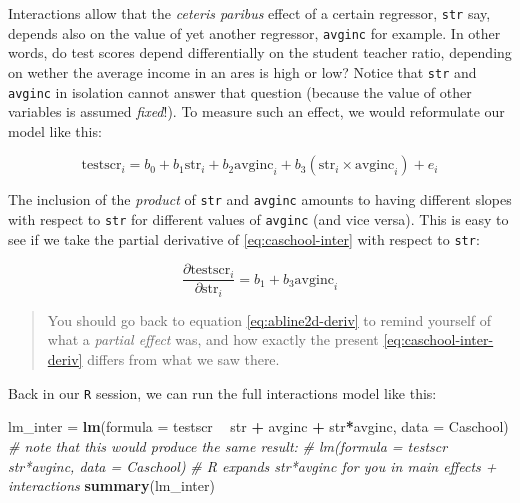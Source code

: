 \documentclass[]{book}
\newenvironment{Shaded}{\begin{snugshade}}{\end{snugshade}}
\newcommand{\KeywordTok}[1]{\textcolor[rgb]{0.13,0.29,0.53}{\textbf{#1}}}
\newcommand{\DataTypeTok}[1]{\textcolor[rgb]{0.13,0.29,0.53}{#1}}
\newcommand{\StringTok}[1]{\textcolor[rgb]{0.31,0.60,0.02}{#1}}
\newcommand{\CommentTok}[1]{\textcolor[rgb]{0.56,0.35,0.01}{\textit{#1}}}
\newcommand{\OperatorTok}[1]{\textcolor[rgb]{0.81,0.36,0.00}{\textbf{#1}}}
\newcommand{\NormalTok}[1]{#1}
\theoremstyle{definition}
\theoremstyle{definition}
\theoremstyle{definition}
\theoremstyle{remark}
\begin{document}
Interactions allow that the \emph{ceteris paribus} effect of a certain
regressor, \texttt{str} say, depends also on the value of yet another
regressor, \texttt{avginc} for example. In other words, do test scores
depend differentially on the student teacher ratio, depending on wether
the average income in an ares is high or low? Notice that \texttt{str}
and \texttt{avginc} in isolation cannot answer that question (because
the value of other variables is assumed \emph{fixed}!). To measure such
an effect, we would reformulate our model like this:

\[
\text{testscr}_i = b_0 + b_1  \text{str}_i + b_2  \text{avginc}_i + b_3 (\text{str}_i \times  \text{avginc}_i)+ e_i \label{eq:caschool-inter}
\]

The inclusion of the \emph{product} of \texttt{str} and \texttt{avginc}
amounts to having different slopes with respect to \texttt{str} for
different values of \texttt{avginc} (and vice versa). This is easy to
see if we take the partial derivative of \eqref{eq:caschool-inter} with
respect to \texttt{str}:

\[
\frac{\partial \text{testscr}_i}{\partial \text{str}_i} = b_1 + b_3 \text{avginc}_i \label{eq:caschool-inter-deriv}
\]

\begin{quote}
You should go back to equation \eqref{eq:abline2d-deriv} to remind
yourself of what a \emph{partial effect} was, and how exactly the
present \eqref{eq:caschool-inter-deriv} differs from what we saw there.
\end{quote}

Back in our \texttt{R} session, we can run the full interactions model
like this:

\begin{Shaded}
\begin{Highlighting}[]
\NormalTok{lm_inter =}\StringTok{ }\KeywordTok{lm}\NormalTok{(}\DataTypeTok{formula =}\NormalTok{ testscr }\OperatorTok{~}\StringTok{ }\NormalTok{str }\OperatorTok{+}\StringTok{ }\NormalTok{avginc }\OperatorTok{+}\StringTok{ }\NormalTok{str}\OperatorTok{*}\NormalTok{avginc, }\DataTypeTok{data =}\NormalTok{ Caschool)}
\CommentTok{# note that this would produce the same result:}
\CommentTok{# lm(formula = testscr ~ str*avginc, data = Caschool)}
\CommentTok{# R expands str*avginc for you in main effects + interactions}
\KeywordTok{summary}\NormalTok{(lm_inter)}
\end{Highlighting}
\end{Shaded}
\end{document}

